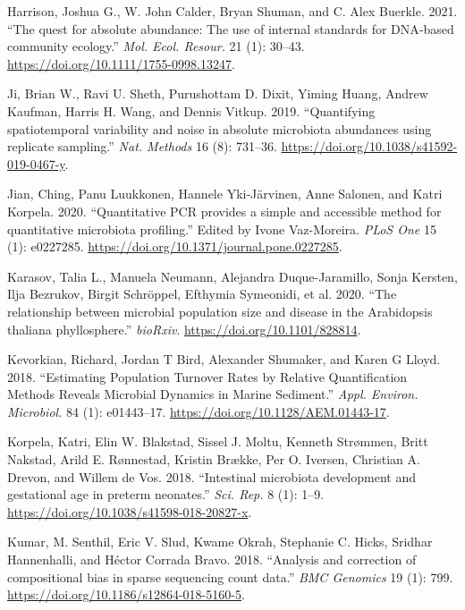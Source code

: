 \documentclass[
]{article}
\newlength{\cslhangindent}
\newlength{\cslentryspacingunit} %
\newenvironment{CSLReferences}[2] %
 {%
  \setlength{\parindent}{0pt}
  \ifodd #1
  \let\oldpar\par
  \def\par{\hangindent=\cslhangindent\oldpar}
  \fi
  \setlength{\parskip}{#2\cslentryspacingunit}
 }%
 {}
\begin{document}
\begin{CSLReferences}{1}{0}
\leavevmode{}%
Harrison, Joshua G., W. John Calder, Bryan Shuman, and C. Alex Buerkle. 2021. {``{The quest for absolute abundance: The use of internal standards for DNA‐based community ecology}.''} \emph{Mol. Ecol. Resour.} 21 (1): 30--43. \url{https://doi.org/10.1111/1755-0998.13247}.

\leavevmode{}%
Ji, Brian W., Ravi U. Sheth, Purushottam D. Dixit, Yiming Huang, Andrew Kaufman, Harris H. Wang, and Dennis Vitkup. 2019. {``{Quantifying spatiotemporal variability and noise in absolute microbiota abundances using replicate sampling}.''} \emph{Nat. Methods} 16 (8): 731--36. \url{https://doi.org/10.1038/s41592-019-0467-y}.

\leavevmode{}%
Jian, Ching, Panu Luukkonen, Hannele Yki-Järvinen, Anne Salonen, and Katri Korpela. 2020. {``{Quantitative PCR provides a simple and accessible method for quantitative microbiota profiling}.''} Edited by Ivone Vaz-Moreira. \emph{PLoS One} 15 (1): e0227285. \url{https://doi.org/10.1371/journal.pone.0227285}.

\leavevmode{}%
Karasov, Talia L., Manuela Neumann, Alejandra Duque-Jaramillo, Sonja Kersten, Ilja Bezrukov, Birgit Schröppel, Efthymia Symeonidi, et al. 2020. {``{The relationship between microbial population size and disease in the Arabidopsis thaliana phyllosphere}.''} \emph{bioRxiv}. \url{https://doi.org/10.1101/828814}.

\leavevmode{}%
Kevorkian, Richard, Jordan T Bird, Alexander Shumaker, and Karen G Lloyd. 2018. {``{Estimating Population Turnover Rates by Relative Quantification Methods Reveals Microbial Dynamics in Marine Sediment}.''} \emph{Appl. Environ. Microbiol.} 84 (1): e01443--17. \url{https://doi.org/10.1128/AEM.01443-17}.

\leavevmode{}%
Korpela, Katri, Elin W. Blakstad, Sissel J. Moltu, Kenneth Strømmen, Britt Nakstad, Arild E. Rønnestad, Kristin Brække, Per O. Iversen, Christian A. Drevon, and Willem de Vos. 2018. {``{Intestinal microbiota development and gestational age in preterm neonates}.''} \emph{Sci. Rep.} 8 (1): 1--9. \url{https://doi.org/10.1038/s41598-018-20827-x}.

\leavevmode{}%
Kumar, M. Senthil, Eric V. Slud, Kwame Okrah, Stephanie C. Hicks, Sridhar Hannenhalli, and Héctor Corrada Bravo. 2018. {``{Analysis and correction of compositional bias in sparse sequencing count data}.''} \emph{BMC Genomics} 19 (1): 799. \url{https://doi.org/10.1186/s12864-018-5160-5}.


\end{CSLReferences}
\end{document}
